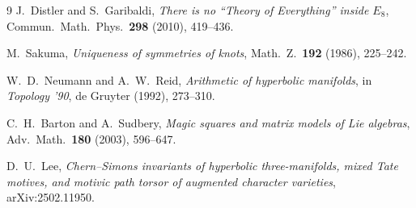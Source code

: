 \documentclass[11pt,a4paper]{article}
\theoremstyle{definition}
\theoremstyle{remark}
\begin{document}
\begin{thebibliography}{9}
 J.~Distler and S.~Garibaldi, \emph{There is no ``Theory of Everything'' inside $E_8$}, Commun.\ Math.\ Phys.\
\textbf{298} (2010), 419--436.

 M.~Sakuma, \emph{Uniqueness of symmetries of knots}, Math.\ Z.\ \textbf{192} (1986), 225--242.

 W.~D.~Neumann and A.~W.~Reid, \emph{Arithmetic of hyperbolic manifolds}, in \emph{Topology '90}, de Gruyter
(1992), 273--310.

 C.~H.~Barton and A.~Sudbery, \emph{Magic squares and matrix models of Lie algebras}, Adv.\ Math.\
\textbf{180} (2003), 596--647.

 D.~U.~Lee, \emph{Chern--Simons invariants of hyperbolic three-manifolds, mixed Tate
motives, and motivic path torsor of augmented character varieties}, arXiv:2502.11950.

\end{thebibliography}
\end{document}
